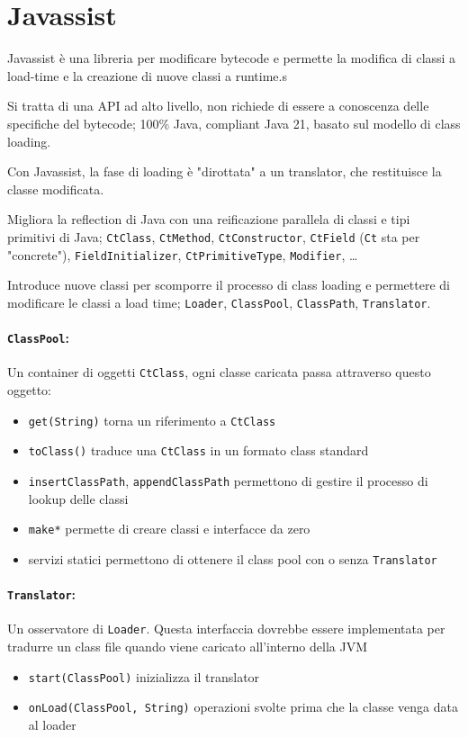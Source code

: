 \section{Javassist}

Javassist è una libreria per modificare bytecode e permette la modifica di classi a load-time e la creazione di nuove classi a runtime.s

Si tratta di una API ad alto livello, non richiede di essere a conoscenza delle specifiche del bytecode; 100\% Java, compliant Java 21, basato sul modello di class loading.

Con Javassist, la fase di loading è "dirottata" a un translator, che restituisce la classe modificata.

Migliora la reflection di Java con una reificazione parallela di classi e tipi primitivi di Java; \texttt{CtClass}, \texttt{CtMethod}, \texttt{CtConstructor}, \texttt{CtField} (\texttt{Ct} sta per "concrete"), \texttt{FieldInitializer}, \texttt{CtPrimitiveType}, \texttt{Modifier}, \dots

Introduce nuove classi per scomporre il processo di class loading e permettere di modificare le classi a load time; \texttt{Loader}, \texttt{ClassPool}, \texttt{ClassPath}, \texttt{Translator}.

\paragraph{\texttt{ClassPool}:} Un container di oggetti \texttt{CtClass}, ogni classe caricata passa attraverso questo oggetto:
\begin{itemize}
    \item \texttt{get(String)} torna un riferimento a \texttt{CtClass}

    \item \texttt{toClass()} traduce una \texttt{CtClass} in un formato class standard

    \item \texttt{insertClassPath}, \texttt{appendClassPath} permettono di gestire il processo di lookup delle classi

    \item \texttt{make*} permette di creare classi e interfacce da zero

    \item servizi statici permettono di ottenere il class pool con o senza \texttt{Translator}
\end{itemize}

\paragraph{\texttt{Translator}:} Un osservatore di \texttt{Loader}. Questa interfaccia dovrebbe essere implementata per tradurre un class file quando viene caricato all'interno della JVM
\begin{itemize}
    \item \texttt{start(ClassPool)} inizializza il translator

    \item \texttt{onLoad(ClassPool, String)} operazioni svolte prima che la classe venga data al loader
\end{itemize}


